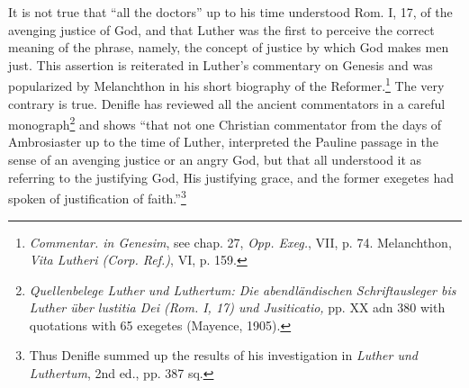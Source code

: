 It is not true that “all the doctors” up to his time understood Rom.
I, 17, of the avenging justice of God, and that Luther was the first
to perceive the correct meaning of the phrase, namely, the concept
of justice by which God makes men just. This assertion is reiterated
in Luther’s commentary on Genesis and was popularized by Melanchthon in
his short biography of the Reformer.\footnote
{\textit{Commentar. in Genesim}, see chap. 27, \textit{Opp. Exeg.}, VII, p. 74. Melanchthon, \textit{Vita
Lutheri (Corp. Ref.)}, VI, p. 159.}
The very contrary
is true. Denifle has reviewed all the ancient commentators in a
careful monograph\footnote
{\textit{Quellenbelege Luther und Luthertum: Die abendländischen Schriftausleger bis Luther
über lustitia Dei (Rom. I, 17) und Jusiticatio,} pp. XX adn 380 with quotations with 65
exegetes (Mayence, 1905).}
 and shows “that not one Christian commentator
from the days of Ambrosiaster up to the time of Luther, interpreted
the Pauline passage in the sense of an avenging justice or an angry
God, but that all understood it as referring to the justifying God,
His justifying grace, and the former exegetes had spoken of justification
of faith.”\footnote
{Thus Denifle summed up the results of his investigation in \textit{Luther und Luthertum},
2nd ed., pp. 387 sq.}

